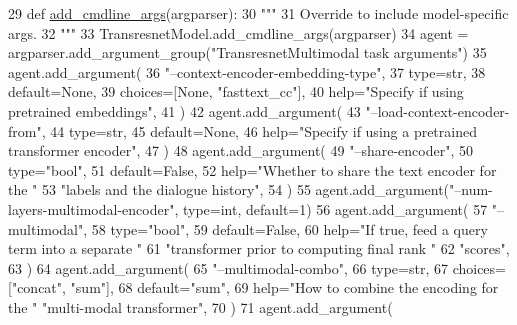 \begin{DoxyCode}
29     \textcolor{keyword}{def }\hyperlink{namespaceparlai_1_1agents_1_1drqa_1_1config_a62fdd5554f1da6be0cba185271058320}{add\_cmdline\_args}(argparser):
30         \textcolor{stringliteral}{"""}
31 \textcolor{stringliteral}{        Override to include model-specific args.}
32 \textcolor{stringliteral}{        """}
33         TransresnetModel.add\_cmdline\_args(argparser)
34         agent = argparser.add\_argument\_group(\textcolor{stringliteral}{"TransresnetMultimodal task arguments"})
35         agent.add\_argument(
36             \textcolor{stringliteral}{"--context-encoder-embedding-type"},
37             type=str,
38             default=\textcolor{keywordtype}{None},
39             choices=[\textcolor{keywordtype}{None}, \textcolor{stringliteral}{"fasttext\_cc"}],
40             help=\textcolor{stringliteral}{"Specify if using pretrained embeddings"},
41         )
42         agent.add\_argument(
43             \textcolor{stringliteral}{"--load-context-encoder-from"},
44             type=str,
45             default=\textcolor{keywordtype}{None},
46             help=\textcolor{stringliteral}{"Specify if using a pretrained transformer encoder"},
47         )
48         agent.add\_argument(
49             \textcolor{stringliteral}{"--share-encoder"},
50             type=\textcolor{stringliteral}{"bool"},
51             default=\textcolor{keyword}{False},
52             help=\textcolor{stringliteral}{"Whether to share the text encoder for the "}
53             \textcolor{stringliteral}{"labels and the dialogue history"},
54         )
55         agent.add\_argument(\textcolor{stringliteral}{"--num-layers-multimodal-encoder"}, type=int, default=1)
56         agent.add\_argument(
57             \textcolor{stringliteral}{"--multimodal"},
58             type=\textcolor{stringliteral}{"bool"},
59             default=\textcolor{keyword}{False},
60             help=\textcolor{stringliteral}{"If true, feed a query term into a separate "}
61             \textcolor{stringliteral}{"transformer prior to computing final rank "}
62             \textcolor{stringliteral}{"scores"},
63         )
64         agent.add\_argument(
65             \textcolor{stringliteral}{"--multimodal-combo"},
66             type=str,
67             choices=[\textcolor{stringliteral}{"concat"}, \textcolor{stringliteral}{"sum"}],
68             default=\textcolor{stringliteral}{"sum"},
69             help=\textcolor{stringliteral}{"How to combine the encoding for the "} \textcolor{stringliteral}{"multi-modal transformer"},
70         )
71         agent.add\_argument(

\end{DoxyCode}
